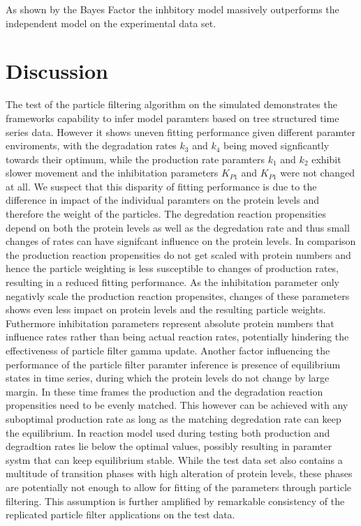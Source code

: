 \documentclass{bioinfo}
\begin{document}
As shown by the Bayes Factor the inhbitory model massively outperforms the independent model on the experimental data set.

\section{Discussion}

The test of the particle filtering algorithm on the simulated demonstrates the frameworks capability to infer model paramters based on tree structured time series data. However it shows uneven fitting performance given different paramter enviroments, with the degradation rates $k_3$ and $k_4$ being moved signficantly towards their optimum, while the production rate paramters $k_1$ and $k_2$ exhibit slower movement and the inhibitation parameters $K_{P1}$ and $K_{P1}$ were not changed at all. We suspect that this disparity of fitting performance is due to the difference in impact of the individual paramters on the protein levels and therefore the weight of the particles. The degredation reaction propensities depend on both the protein levels as well as the degredation rate and thus small changes of rates can have signifcant influence on the protein levels. In comparison the production reaction propensities do not get scaled with protein numbers and hence the particle weighting is less susceptible to changes of production rates, resulting in a reduced fitting performance. As the inhibitation parameter only negativly scale the production reaction propensites, changes of these parameters shows even less impact on protein levels and the resulting particle weights. Futhermore inhibitation parameters represent absolute protein numbers that influence rates rather than being actual reaction rates, potentially hindering the effectiveness of particle filter gamma update. Another factor influencing the performance of the particle filter paramter inference is presence of equilibrium states in time series, during which the protein levels do not change by large margin. In these time frames the production and the degradation reaction propensities need to be evenly matched. This however can be achieved with any suboptimal production rate as long as the matching degredation rate can keep the equilibrium. In reaction model used during testing both production and degradtion rates lie below the optimal values, possibly resulting in paramter systm that can keep equilibrium stable. While the test data set also contains a multitude of transition phases with high alteration of protein levels, these phases are potentially not enough to allow for fitting of the parameters through particle filtering. This assumption is further amplified by remarkable consistency of the replicated particle filter applications on the test data.
\end{document}
